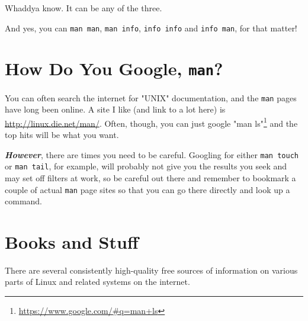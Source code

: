 \documentclass[10pt,american,]{book}
\renewcommand{\href}[2]{#2\footnote{\url{#1}}}
\numberwithin{figure}{chapter}
\begin{document}
Whaddya know. It can be any of the three.

And yes, you can \texttt{man\ man}, \texttt{man\ info},
\texttt{info\ info} and \texttt{info\ man}, for that matter!

\section*{\texorpdfstring{How Do You Google,
\texttt{man}?}{How Do You Google, man?}}\label{how-do-you-google-man}

You can often search the internet for "UNIX" documentation, and the
\texttt{man} pages have long been online. A site I like (and link to a
lot here) is
\url{http://linux.die.net/man/}.
Often, though, you can just google
\href{https://www.google.com/\#q=man+ls}{"man ls"} and the top hits will
be what you want.

\textbf{\emph{However}}, there are times you need to be careful.
Googling for either \texttt{man\ touch} or \texttt{man\ tail}, for
example, will probably not give you the results you seek and may set off
filters at work, so be careful out there and remember to bookmark a
couple of actual \texttt{man} page sites so that you can go there
directly and look up a command.

\section*{Books and Stuff}\label{books-and-stuff}

There are several consistently high-quality free sources of information
on various parts of Linux and related systems on the internet.
\end{document}
